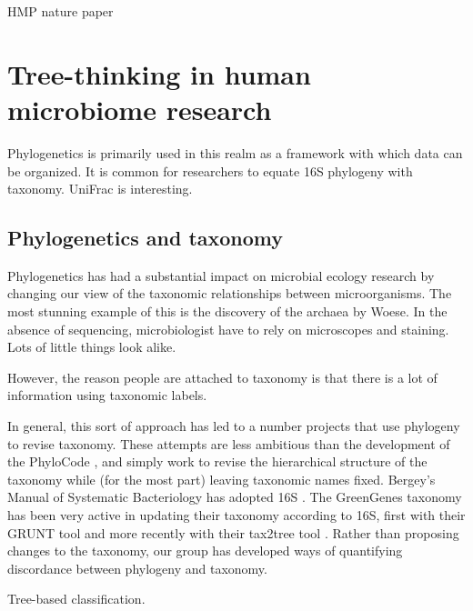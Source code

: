 \documentclass{amsart}
\begin{document}
HMP nature paper
\cite{methe2012framework}




\section{Tree-thinking in human microbiome research}

Phylogenetics is primarily used in this realm as a framework with which data can be organized.
It is common for researchers to equate 16S phylogeny with taxonomy.
UniFrac is interesting.

\subsection{Phylogenetics and taxonomy}

Phylogenetics has had a substantial impact on microbial ecology research by changing our view of the taxonomic relationships between microorganisms.
The most stunning example of this is the discovery of the archaea by Woese.
In the absence of sequencing, microbiologist have to rely on microscopes and staining.
Lots of little things look alike.

However, the reason people are attached to taxonomy is that there is a lot of information using taxonomic labels.

In general, this sort of approach has led to a number projects that use phylogeny to revise taxonomy.
These attempts are less ambitious than the development of the PhyloCode \cite{forey2001phylocode}, and simply work to revise the hierarchical structure of the taxonomy while (for the most part) leaving taxonomic names fixed.
Bergey's Manual of Systematic Bacteriology has adopted 16S \cite{kreig1984bergey}.
The GreenGenes taxonomy \cite{desantis2006greengenes} has been very active in updating their taxonomy according to 16S, first with their GRUNT tool \cite{dalevi2007automated} and more recently with their tax2tree tool \cite{mcdonald2011improved}.
Rather than proposing changes to the taxonomy, our group \cite{matsen2011reconciling} has developed ways of quantifying discordance between phylogeny and taxonomy.

Tree-based classification.
\cite{bazinet2012comparative}
\end{document}
